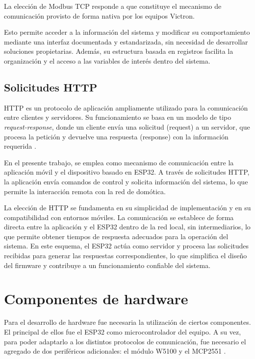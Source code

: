 La elección de Modbus TCP responde a que constituye el mecanismo de comunicación provisto de forma nativa por los equipos Victron. 

Esto permite acceder a la información del sistema y modificar su comportamiento mediante una interfaz documentada y estandarizada, sin necesidad de desarrollar soluciones propietarias. Además, su estructura basada en registros facilita la organización y el acceso a las variables de interés dentro del sistema.

\subsection{Solicitudes HTTP}
\label{sec:http}

HTTP es un protocolo de aplicación ampliamente utilizado para la comunicación entre clientes y servidores. Su funcionamiento se basa en un modelo de tipo \textit{request-response}, donde un cliente envía una solicitud (request) a un servidor, que procesa la petición y devuelve una respuesta (response) con la información requerida \citep{web_solicitudes_http}.

En el presente trabajo, se emplea como mecanismo de comunicación entre la aplicación móvil y el dispositivo basado en ESP32. A través de solicitudes HTTP, la aplicación envía comandos de control y solicita información del sistema, lo que permite la interacción remota con la red de domótica.

La elección de HTTP se fundamenta en su simplicidad de implementación y en su compatibilidad con entornos móviles. La comunicación se establece de forma directa entre la aplicación y el ESP32 dentro de la red local, sin intermediarios, lo que permite obtener tiempos de respuesta adecuados para la operación del sistema. En este esquema, el ESP32 actúa como servidor y procesa las solicitudes recibidas para generar las respuestas correspondientes, lo que simplifica el diseño del firmware y contribuye a un funcionamiento confiable del sistema.

\section{Componentes de hardware}
\label{sec:componentes_hardware}
Para el desarrollo de hardware fue necesaria la utilización de ciertos componentes. El principal de ellos fue el ESP32 como microcontrolador del equipo. A su vez, para poder adaptarlo a los distintos protocolos de comunicación, fue necesario el agregado de dos periféricos adicionales: el módulo W5100  \citep{w5100_datasheet} y el MCP2551 \citep{2551_datasheet}.

